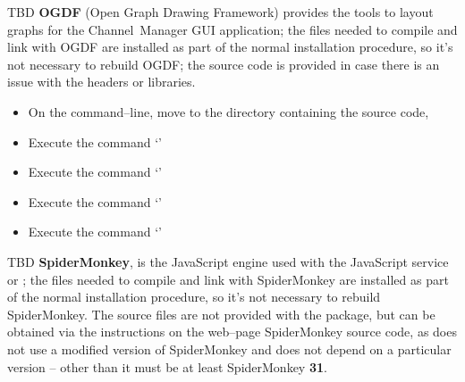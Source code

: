\tertiaryEnd{}
TBD
\tertiaryEnd{}
\secondaryEnd{}
\textbf{OGDF} (Open Graph Drawing Framework) provides the tools to layout graphs for the
Channel~Manager GUI application; the files needed to compile and link with OGDF are
installed as part of the normal \mplusm{} installation procedure, so it's not necessary to
rebuild OGDF; the source code is provided in case there is an issue with the headers or
libraries.
\begin{itemize}
\item On the command--line, move to the directory containing the \mplusm{} source code,
\item Execute the command `'
\item Execute the command `'
\item Execute the command `'
\item Execute the command `'
\end{itemize}
\tertiaryEnd{}
TBD
\tertiaryEnd{}
\secondaryEnd{}
\textbf{SpiderMonkey}, is the JavaScript engine used with the JavaScript service or
\mplusm{}; the files needed to compile and link with SpiderMonkey are installed as part of
the normal \mplusm{} installation procedure, so it's not necessary to rebuild
SpiderMonkey.
The source files are not provided with the  package, but can be obtained
via the instructions on the web--page
%
{SpiderMonkey source code}, as \mplusm{} does not use a modified version of SpiderMonkey
and does not depend on a particular version -- other than it must be at least SpiderMonkey
\textbf{31}.
